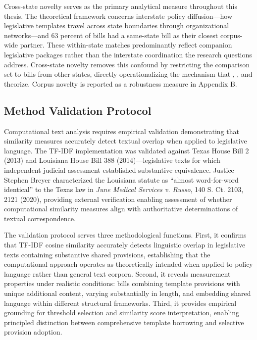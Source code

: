 Cross-state novelty serves as the primary analytical measure throughout this thesis. The theoretical framework concerns interstate policy diffusion---how legislative templates travel across state boundaries through organizational networks---and 63 percent of bills had a same-state bill as their closest corpus-wide partner. These within-state matches predominantly reflect companion legislative packages rather than the interstate coordination the research questions address. Cross-state novelty removes this confound by restricting the comparison set to bills from other states, directly operationalizing the mechanism that \textcite{walkerDiffusionInnovationsAmerican1969}, \textcite{berryStateLotteryAdoptions1990}, and \textcite{shipanMechanismsPolicyDiffusion2008a} theorize. Corpus novelty is reported as a robustness measure in Appendix B.

\subsection{Method Validation Protocol}
Computational text analysis requires empirical validation demonstrating that similarity measures accurately detect textual overlap when applied to legislative language. The TF-IDF implementation was validated against Texas House Bill 2 (2013) and Louisiana House Bill 388 (2014)---legislative texts for which independent judicial assessment established substantive equivalence. Justice Stephen Breyer characterized the Louisiana statute as ``almost word-for-word identical'' to the Texas law in \emph{June Medical Services v. Russo}, 140 S. Ct. 2103, 2121 (2020), providing external verification enabling assessment of whether computational similarity measures align with authoritative determinations of textual correspondence.

The validation protocol serves three methodological functions. First, it confirms that TF-IDF cosine similarity accurately detects linguistic overlap in legislative texts containing substantive shared provisions, establishing that the computational approach operates as theoretically intended when applied to policy language rather than general text corpora. Second, it reveals measurement properties under realistic conditions: bills combining template provisions with unique additional content, varying substantially in length, and embedding shared language within different structural frameworks. Third, it provides empirical grounding for threshold selection and similarity score interpretation, enabling principled distinction between comprehensive template borrowing and selective provision adoption.

